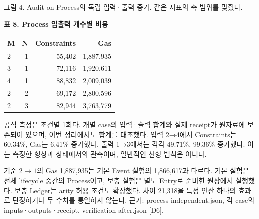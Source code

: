 {\small 그림 4. Audit on Process의 독립 입력·출력 증가. 같은 지표의 축 범위를 맞췄다.}\par
\begin{center}\small\setlength{\tabcolsep}{6pt}
    \textbf{표 8. Process 입출력 개수별 비용}\par\smallskip
    \begin{tabular}{@{}lrrr@{}}\toprule
        \textbf{M} & \textbf{N} & \textbf{Constraints} & \textbf{Gas} \\ \midrule
        2          & 1          & 55,402               & 1,887,935    \\
        3          & 1          & 72,116               & 1,920,611    \\
        4          & 1          & 88,832               & 2,009,039    \\
        2          & 2          & 69,172               & 2,800,596    \\
        2          & 3          & 82,944               & 3,763,779    \\
        \bottomrule\end{tabular}\end{center}

공식 측정은 조건별 1회다. 개별 case의 입력·출력 합계와 실제 receipt가 원자료에 보존되어 있으며, 이번 정리에서도 합계를 대조했다.
입력 2→4에서 Constraints는 60.34\%, Gas는 6.41\% 증가했다. 출력 1→3에서는 각각 49.71\%, 99.36\% 증가했다.
이는 측정한 형상과 상태에서의 관측이며, 일반적인 선형 법칙은 아니다.

기준 $2\to1$의 Gas 1,887,935는 기본 Event 실험의 1,866,617과 다르다.
기본 실험은 전체 lifecycle 중간의 Process이고, 보충 실험은 별도 Entry로 준비한 원장에서 실행했다.
보충 Ledger는 arity 허용 조건도 확장했다. 차이 21,318을 특정 연산 하나의 효과로 단정하거나 두 수치를 통일하지 않는다.
    {\small 근거: process-independent.json, 각 case의 inputs·outputs·receipt, verification-after.json [D6].}\par

